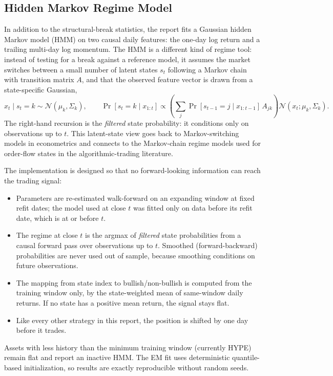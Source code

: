 \documentclass[11pt]{article}
\begin{document}
\subsection{Hidden Markov Regime Model}

In addition to the structural-break statistics, the report fits a Gaussian hidden Markov model (HMM) on two causal daily features: the one-day log return and a trailing multi-day log momentum. The HMM is a different kind of regime tool: instead of testing for a break against a reference model, it assumes the market switches between a small number of latent states $s_t$ following a Markov chain with transition matrix $A$, and that the observed feature vector is drawn from a state-specific Gaussian,
\[
    x_t \mid s_t = k \sim \mathcal{N}(\mu_k, \Sigma_k),
    \qquad
    \Pr[s_t = k \mid x_{1:t}] \propto
    \left( \textstyle\sum_j \Pr[s_{t-1} = j \mid x_{1:t-1}]\, A_{jk} \right) \mathcal{N}(x_t; \mu_k, \Sigma_k).
\]
The right-hand recursion is the \emph{filtered} state probability: it conditions only on observations up to $t$. This latent-state view goes back to Markov-switching models in econometrics and connects to the Markov-chain regime models used for order-flow states in the algorithmic-trading literature.

The implementation is designed so that no forward-looking information can reach the trading signal:
\begin{itemize}
    \item Parameters are re-estimated walk-forward on an expanding window at fixed refit dates; the model used at close $t$ was fitted only on data before its refit date, which is at or before $t$.
    \item The regime at close $t$ is the argmax of \emph{filtered} state probabilities from a causal forward pass over observations up to $t$. Smoothed (forward-backward) probabilities are never used out of sample, because smoothing conditions on future observations.
    \item The mapping from state index to bullish/non-bullish is computed from the training window only, by the state-weighted mean of same-window daily returns. If no state has a positive mean return, the signal stays flat.
    \item Like every other strategy in this report, the position is shifted by one day before it trades.
\end{itemize}
Assets with less history than the minimum training window (currently HYPE) remain flat and report an inactive HMM. The EM fit uses deterministic quantile-based initialization, so results are exactly reproducible without random seeds.
\end{document}
